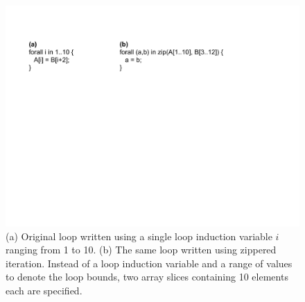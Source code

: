 \begin{figure}
	\begin{center}
	\includegraphics[scale=0.55]{./Figures/affine_loop}
	\caption{(a) Original loop written using a single loop induction variable $i$ ranging from 1 to 10. (b) The same loop written using zippered iteration. Instead of a loop induction variable and a range of values to denote the loop bounds, two array slices containing 10 elements each are specified.}
	\label{affine_loop}
	\end{center}
\end{figure}